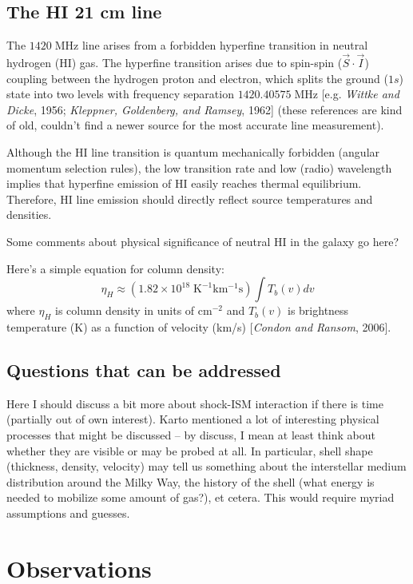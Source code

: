 \documentclass[10pt]{article}
\newcommand {\mt}{\mathrm}
\newcommand {\unit}[1]{\; \mt{#1}}
\begin{document}
\subsection{The HI 21 cm line}

The $1420\unit{MHz}$ line arises from a forbidden hyperfine transition in neutral hydrogen (HI) gas.  The hyperfine transition arises due to spin-spin ($\vec{S}\cdot\vec{I}$) coupling between the hydrogen proton and electron, which splits the ground ($1s$) state into two levels with frequency separation $1420.40575 \unit{MHz}$ [e.g. \textit{Wittke and Dicke}, 1956; \textit{Kleppner, Goldenberg, and Ramsey}, 1962] (these references are kind of old, couldn't find a newer source for the most accurate line measurement).

Although the HI line transition is quantum mechanically forbidden (angular momentum selection rules), the low transition rate and low (radio) wavelength implies that hyperfine emission of HI easily reaches thermal equilibrium.  Therefore, HI line emission should directly reflect source temperatures and densities.

Some comments about physical significance of neutral HI in the galaxy go here?

Here's a simple equation for column density:
\[
    \eta_H \approx (1.82 \times 10^{18} \unit{K^{-1} km^{-1} s}) \int T_b\left(v\right) dv
\]
where $\eta_H$ is column density in units of $\mt{cm}^{-2}$ and $T_b(v)$ is brightness temperature (K) as a function of velocity (km/s) [\textit{Condon and Ransom}, 2006].

\subsection{Questions that can be addressed}

Here I should discuss a bit more about shock-ISM interaction if there is time (partially out of own interest).  Karto mentioned a lot of interesting physical processes that might be discussed -- by discuss, I mean at least think about whether they are visible or may be probed at all.  In particular, shell shape (thickness, density, velocity) may tell us something about the interstellar medium distribution around the Milky Way, the history of the shell (what energy is needed to mobilize some amount of gas?), et cetera.  This would require myriad assumptions and guesses.

\section{Observations}
\end{document}
